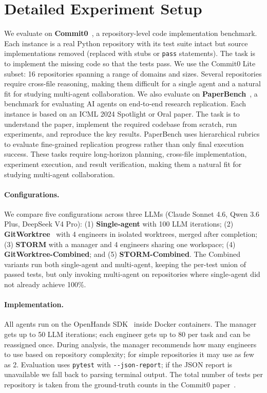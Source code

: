\documentclass{article}
\begin{document}



\newpage
\appendix


\section{Detailed Experiment Setup}
\label{appendix:setup}

We evaluate on \textbf{Commit0}~\citep{commit0}, a repository-level code implementation benchmark. Each instance is a real Python repository with its test suite intact but source implementations removed (replaced with stubs or \texttt{pass} statements). The task is to implement the missing code so that the tests pass. We use the Commit0 Lite subset: 16 repositories spanning a range of domains and sizes. Several repositories require cross-file reasoning, making them difficult for a single agent and a natural fit for studying multi-agent collaboration.
We also evaluate on \textbf{PaperBench}~\citep{PaperBench}, a benchmark for evaluating AI agents on end-to-end research replication. Each instance is based on an ICML 2024 Spotlight or Oral paper. The task is to understand the paper, implement the required codebase from scratch, run experiments, and reproduce the key results. PaperBench uses hierarchical rubrics to evaluate fine-grained replication progress rather than only final execution success. These tasks require long-horizon planning, cross-file implementation, experiment execution, and result verification, making them a natural fit for studying multi-agent collaboration.

\paragraph{Configurations.} We compare five configurations across three LLMs (Claude Sonnet 4.6, Qwen 3.6 Plus, DeepSeek V4 Pro): (1) \textbf{Single-agent} with 100 LLM iterations; (2) \textbf{GitWorktree}~\citep{caid} with 4 engineers in isolated worktrees, merged after completion; (3) \textbf{STORM} with a manager and 4 engineers sharing one workspace; (4) \textbf{GitWorktree-Combined}; and (5) \textbf{STORM-Combined}. The Combined variants run both single-agent and multi-agent, keeping the per-test union of passed tests, but only invoking multi-agent on repositories where single-agent did not already achieve 100\%.

\paragraph{Implementation.} All agents run on the OpenHands SDK~\citep{openhands} inside Docker containers. The manager gets up to 50 LLM iterations; each engineer gets up to 80 per task and can be reassigned once. During analysis, the manager recommends how many engineers to use based on repository complexity; for simple repositories it may use as few as 2. Evaluation uses \texttt{pytest} with \texttt{-{}-json-report}; if the JSON report is unavailable we fall back to parsing terminal output. The total number of tests per repository is taken from the ground-truth counts in the Commit0 paper~\citep{commit0}.
\end{document}
